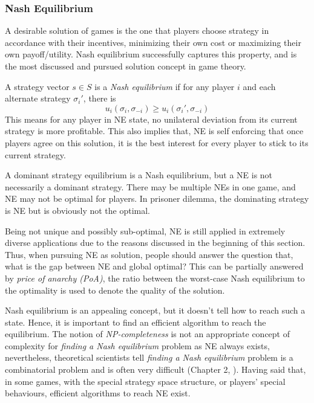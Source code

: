 \subsubsection*{Nash Equilibrium}
A desirable solution of games is the one that players choose strategy in accordance with their incentives, minimizing their own cost or maximizing their own payoff/utility.
Nash equilibrium successfully captures this property, and is the most discussed and pursued solution concept in game theory.

A strategy vector $s\in S$ is a \textit{Nash equilibrium} if for any player $i$ and each alternate strategy $\sigma_i'$, there is
 \[ u_i(\sigma_i, \sigma_{-i}) \geq u_i(\sigma_i', \sigma_{-i})\]
This means for any player in NE state, no unilateral deviation from its current strategy is more profitable.
This also implies that, NE is self enforcing that once players agree on this solution, it is the best interest for every player to stick to its current strategy.

A dominant strategy equilibrium is a Nash equilibrium, but a NE is not necessarily a dominant strategy.
There may be multiple NEs in one game, and NE may not be optimal for players. 
In prisoner dilemma, the dominating strategy is NE but is obviously not the optimal.


Being not unique and possibly sub-optimal, NE is still applied in extremely diverse applications due to the reasons discussed in the beginning of this section.
Thus, when pursuing NE as solution, people should answer the question that, what is the gap between NE and global optimal?
This can be partially answered by \textit{price of anarchy (\gls{PoA})}, the ratio between the worst-case Nash equilibrium to the optimality is used to denote the quality of the solution.

Nash equilibrium is an appealing concept, but it doesn't tell how to reach such a state.
Hence, it is important to find an efficient algorithm to reach the equilibrium.
The notion of \textit{NP-completeness} is not an appropriate concept of complexity for \textit{finding a Nash equilibrium} problem as NE always exists, nevertheless, theoretical scientists tell \textit{finding a Nash equilibrium} problem is a combinatorial problem and is often very difficult (Chapter 2, \cite{agt_book}).
Having said that, in some games, with the special strategy space structure, or players' special behaviours, efficient algorithms to reach NE exist.





